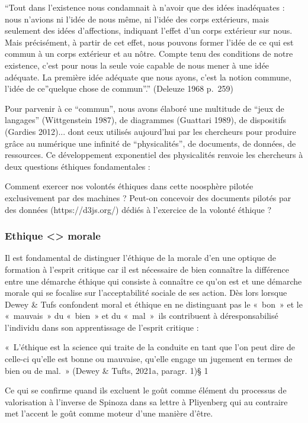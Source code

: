 \documentclass[
  letterpaper,
  DIV=11,
  numbers=noendperiod]{scrreprt}
\begin{document}
``Tout dans l'existence nous condamnait à n'avoir que des idées
inadéquates : nous n'avions ni l'idée de nous même, ni l'idée des corps
extérieurs, mais seulement des idées d'affections, indiquant l'effet
d'un corps extérieur sur nous. Mais précisément, à partir de cet effet,
nous pouvons former l'idée de ce qui est commun à un corps extérieur et
au nôtre. Compte tenu des conditions de notre existence, c'est pour nous
la seule voie capable de nous mener à une idée adéquate. La première
idée adéquate que nous ayons, c'est la notion commune, l'idée de
ce''quelque chose de commun''.'' (Deleuze 1968 p.~259)

Pour parvenir à ce ``commun'', nous avons élaboré une multitude de
``jeux de langages'' (Wittgenstein 1987), de diagrammes (Guattari 1989),
de dispositifs (Gardies 2012)... dont ceux utilisés aujourd'hui par les
chercheurs pour produire grâce au numérique une infinité de
``physicalités'', de documents, de données, de ressources. Ce
développement exponentiel des physicalités renvoie les chercheurs à deux
questions éthiques fondamentales :

Comment exercer nos volontés éthiques dans cette noosphère pilotée
exclusivement par des machines ? Peut-on concevoir des documents pilotés
par des données (https://d3js.org/) dédiés à l'exercice de la volonté
éthique ?

\hypertarget{ethique-morale}{%
\subsubsection{Ethique \textless\textgreater{}
morale}\label{ethique-morale}}

Il est fondamental de distinguer l'éthique de la morale d'en une optique
de formation à l'esprit critique car il est nécessaire de bien connaître
la différence entre une démarche éthique qui consiste à connaître ce
qu'on est et une démarche morale qui se focalise sur l'acceptabilité
sociale de ses action. Dès lors lorsque Dewey \& Tufs confondent moral
et éthique en ne distinguant pas le «~bon~» et le «~mauvais~» du
«~bien~» et du «~mal~»~ils contribuent à déresponsabilisé l'individu
dans son apprentissage de l'esprit critique :

«~L'éthique est la science qui traite de la conduite en tant que l'on
peut dire de celle-ci qu'elle est bonne ou mauvaise, qu'elle engage un
jugement en termes de bien ou de mal.~» (Dewey \& Tufts, 2021a, paragr.
1)§ 1

Ce qui se confirme quand ils excluent le goût comme élément du processus
de valorisation à l'inverse de Spinoza dans sa lettre à Pliyenberg qui
au contraire met l'accent le goût comme moteur d'une manière d'être.
\end{document}
